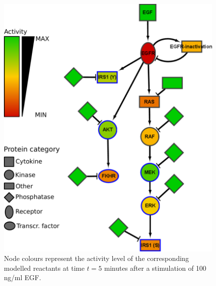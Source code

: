 \documentclass{bmcart}
\begin{document}
\begin{figure}[!tpb]
\begin{minipage}{\textwidth}
\centering
  \includegraphics[width=.7\textwidth]{images/large_network_egf3}
\caption{ Node colours represent the
activity level of the corresponding modelled reactants at time $t = 5$ minutes after
a stimulation of 100 ng/ml EGF.}\label{fig:large-model-egf}
\end{minipage}
\end{figure}
\end{document}
